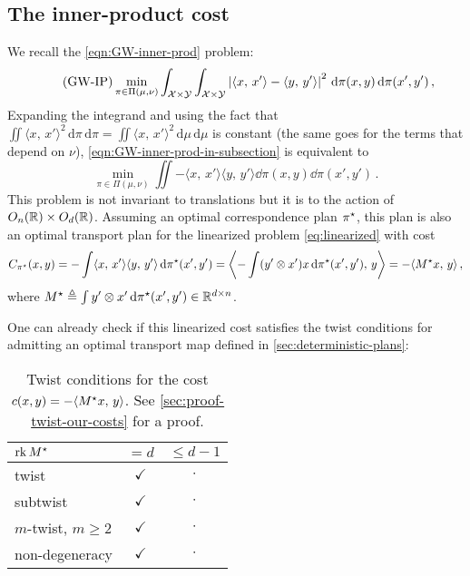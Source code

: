     \subsection{The inner-product cost}
    \label{subsec:applications_innerProduct}
        We recall the \cref{eqn:GW-inner-prod} problem:
        \begin{equation}
            \tag{GW-IP}
            \min _{\pi \in \Pi(\mu,\nu)} \int_{\mathcal{X}\times\mathcal{Y}}\int_{\mathcal{X}\times\mathcal{Y}}\left|\langle x,\, x'\rangle-\langle y,\, y'\rangle\right|^{2} \,\mathrm d\pi(x, y) \,\mathrm d\pi(x', y')\,,
            \label{eqn:GW-inner-prod-in-subsection}
        \end{equation}
        Expanding the integrand and using the fact that $\iint\langle x,\,x'\rangle^2 \, \mathrm d\pi\, \mathrm d\pi=\iint\langle x,\,x'\rangle^2 \, \mathrm d\mu\, \mathrm d\mu$ is constant (the same goes for the terms that depend on $\nu$), \cref{eqn:GW-inner-prod-in-subsection} is equivalent to
        \begin{equation*}
            \min _{\pi \in \Pi(\mu,\nu)} \iint-\langle x,\, x'\rangle\langle y,\, y'\rangle \dd\pi(x, y) \dd\pi(x', y')\,.
        \end{equation*}
        This problem is not invariant to translations but it is to the action of $O_n(\mathbb{R}) \times O_d(\mathbb{R})$. Assuming an optimal correspondence plan $\pi^\star$, this plan is also an optimal transport plan for the linearized problem \cref{eq:linearized} with cost
        \begin{align*}
            C_{\pi^\star}(x,y)=-\int\langle x,\, x'\rangle\langle y,\, y'\rangle \,\mathrm d\pi^\star(x', y')=\left\langle -\int(y'\otimes x')x \,\mathrm d\pi^\star(x', y'),\, y \right\rangle=-\langle M^\star x,\,y\rangle\,,
        \end{align*}
        where $M^\star\triangleq\int y'\otimes x' \,\mathrm d\pi^\star(x', y')\in \mathbb{R}^{d\times n}$.

        One can already check if this linearized cost satisfies the twist conditions for admitting an optimal transport map defined in \cref{sec:deterministic-plans}:
        \begin{table}[h]
            \centering
            \caption{Twist conditions for the cost $c(x,y)=-\langle M^\star x,\,y\rangle$. See \cref{sec:proof-twist-our-costs} for a proof.}
            \label{tab:twist-inner}
            \begin{tabular}{lcc}
            $\operatorname*{rk} M^\star$ & $= d$          & $\leq d-1$        \\\hline
            twist         & $\checkmark$   &  $\cdot$          \\
            subtwist      & $\checkmark$   &  $\cdot$          \\
            $m$-twist, $m\geq2$     & $\checkmark$   &  $\cdot$ \\
            non-degeneracy & $\checkmark$ & $\cdot$
            \end{tabular}
        \end{table}

